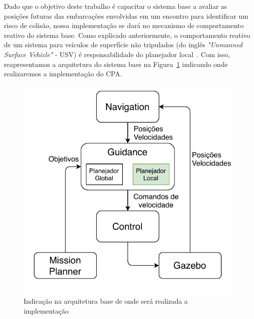     
    
    Dado que o objetivo deste trabalho é capacitar o sistema base a avaliar as posições futuras das embarcações envolvidas em um encontro para identificar um risco de colisão, nossa implementação se dará no mecanismo de comportamento reativo do sistema base. Como explicado anteriormente, o comportamento reativo de um sistema para veículos de superfície não tripulados (do inglês \textit{"Unmanned Surface Vehicle"} - USV) é responsabilidade do planejador local~\cite{Jurak2020COLREGS}. Com isso, reapresentamos a arquitetura do sistema baes na Figura~\ref{fig:chap4_onde_implementar_cpa} indicando onde realizaremos a implementação do CPA.
    
    
    \begin{figure}
        \centering
        \includegraphics{fig/chap4/onde_implementar_cpa.pdf}
        \caption{Indicação na arquitetura base de onde será realizada a implementação}
        \label{fig:chap4_onde_implementar_cpa}
    \end{figure}
    
    
    
